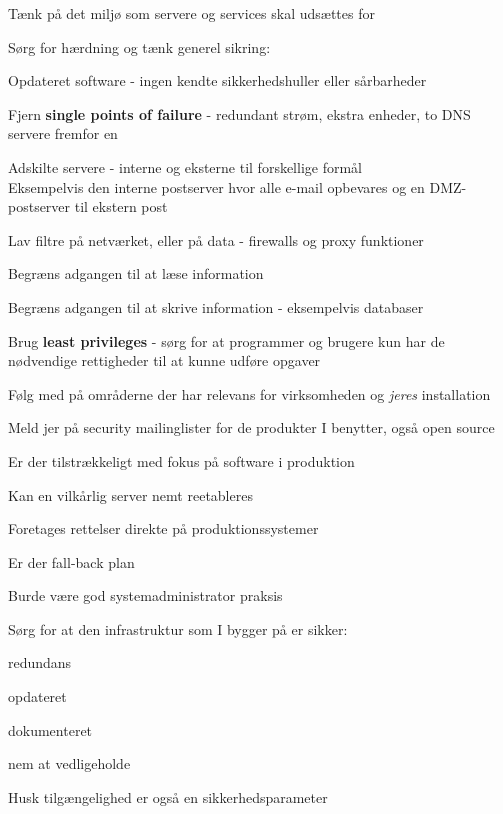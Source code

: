 \documentclass[Screen16to9,17pt]{foils}
\begin{document}
\begin{list1}
\item Tænk på det miljø som servere og services skal udsættes for
\item Sørg for hærdning og tænk generel sikring:
  \begin{list2}
  \item Opdateret software - ingen kendte sikkerhedshuller eller
  sårbarheder
\item Fjern {\bfseries single points of failure} - redundant strøm, ekstra enheder, to DNS servere fremfor en
\item Adskilte servere - interne og eksterne til forskellige formål\\
Eksempelvis den interne postserver hvor alle e-mail opbevares og en
DMZ-postserver til ekstern post
\item Lav filtre på netværket, eller på data - firewalls og proxy
  funktioner
\item Begræns adgangen til at læse information
\item Begræns adgangen til at skrive information - eksempelvis databaser
\item Brug {\bfseries least privileges} - sørg for at programmer og brugere
  kun har de nødvendige rettigheder til at kunne udføre opgaver
\item Følg med på områderne der har relevans for virksomheden og
  \emph{jeres} installation
  \end{list2}
  \item Meld jer på security mailinglister for de produkter I benytter, også open source
\end{list1}



\begin{list1}
\item Er der tilstrækkeligt med fokus på software i produktion
\item Kan en vilkårlig server nemt reetableres
\item Foretages rettelser direkte på produktionssystemer
\item Er der fall-back plan
\item Burde være god systemadministrator praksis
\end{list1}




\begin{list1}
\item Sørg for at den infrastruktur som I bygger på er sikker:
\begin{list2}
 \item redundans
       \item opdateret
        \item dokumenteret
        \item nem at vedligeholde
\end{list2}

\item  Husk tilgængelighed er også en sikkerhedsparameter
\end{list1}
\end{document}
